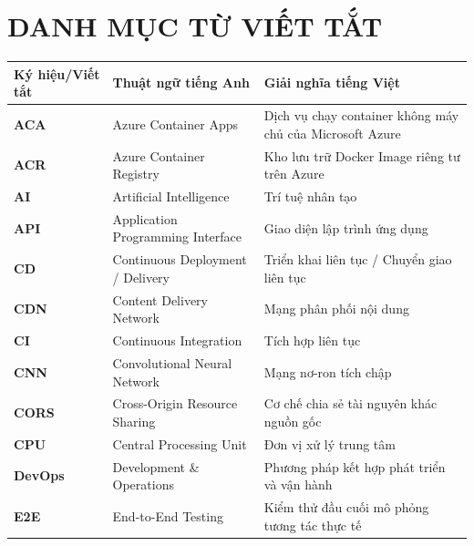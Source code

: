 
\chapter*{DANH MỤC TỪ VIẾT TẮT}

\begin{center}
\begin{singlespace}
\fontsize{10.5pt}{13pt}\selectfont
\renewcommand{\arraystretch}{1.04}
\noindent\begin{tabularx}{\textwidth}{l p{5.5cm} X}
\toprule
\textbf{Ký hiệu/Viết tắt} & \textbf{Thuật ngữ tiếng Anh} & \textbf{Giải nghĩa tiếng Việt} \\
\midrule
\textbf{ACA}          & Azure Container Apps & Dịch vụ chạy container không máy chủ của Microsoft Azure \\
\textbf{ACR}          & Azure Container Registry & Kho lưu trữ Docker Image riêng tư trên Azure \\
\textbf{AI}           & Artificial Intelligence & Trí tuệ nhân tạo \\
\textbf{API}          & Application Programming Interface & Giao diện lập trình ứng dụng \\
\textbf{CD}           & Continuous Deployment / Delivery & Triển khai liên tục / Chuyển giao liên tục \\
\textbf{CDN}          & Content Delivery Network & Mạng phân phối nội dung \\
\textbf{CI}           & Continuous Integration & Tích hợp liên tục \\
\textbf{CNN}          & Convolutional Neural Network & Mạng nơ-ron tích chập \\
\textbf{CORS}         & Cross-Origin Resource Sharing & Cơ chế chia sẻ tài nguyên khác nguồn gốc \\
\textbf{CPU}          & Central Processing Unit & Đơn vị xử lý trung tâm \\
\textbf{DevOps}       & Development \& Operations & Phương pháp kết hợp phát triển và vận hành \\
\textbf{E2E}          & End-to-End Testing & Kiểm thử đầu cuối mô phỏng tương tác thực tế \\

\end{tabularx}
\end{singlespace}
\end{center}
